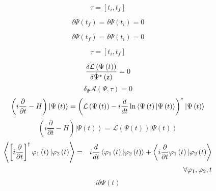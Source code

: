 \documentclass[aps,preprint]{revtex4}
\begin{document}
\begin{equation}
\tau =\left[ t_{i},t_{f}\right]
\end{equation}

\begin{equation}
\delta \Psi \left( t_{f}\right) =\delta \Psi \left( t_{i}\right) =0
\end{equation}

\begin{equation}
\delta \Psi \left( t_{f}\right) =\delta \Psi \left( t_{i}\right) =0
\end{equation}

\begin{equation}
\tau =\left[ t_{i},t_{f}\right]
\end{equation}

\begin{equation}
\frac{\delta \mathcal{L}\left( \Psi \left( t\right) \right) }{\delta \dot{%
\Psi}^{\ast }\left( \mathsf{z}\right) }=0
\end{equation}%
\begin{equation}
\delta _{\Psi }\mathcal{A}\left( \Psi ,\tau \right) =0
\end{equation}%
\begin{equation}
\left( i\frac{\partial }{\partial t}-H\right) \left| \Psi \left( t\right)
\right\rangle =\left( \mathcal{L}\left( \Psi \left( t\right) \right) -i\frac{%
d}{dt}\ln \left\langle \Psi \left( t\right) |\Psi \left( t\right)
\right\rangle \right) ^{\ast }\left| \Psi \left( t\right) \right\rangle
\end{equation}%
\begin{equation}
\left( i\frac{\partial }{\partial t}-H\right) \left| \Psi \left( t\right)
\right\rangle =\mathcal{L}\left( \Psi \left( t\right) \right) \left| \Psi
\left( t\right) \right\rangle
\end{equation}%
\begin{eqnarray}
\left\langle \left[ i\frac{\partial }{\partial t}\right] ^{\dagger }\varphi
_{1}\left( t\right) |\varphi _{2}\left( t\right) \right\rangle &=&i\frac{d}{%
dt}\left\langle \varphi _{1}\left( t\right) |\varphi _{2}\left( t\right)
\right\rangle +\left\langle i\frac{\partial }{\partial t}\varphi _{1}\left(
t\right) |\varphi _{2}\left( t\right) \right\rangle \\
&&\qquad \qquad \qquad \qquad \qquad \qquad \quad \forall \varphi
_{1},\varphi _{2},t
\end{eqnarray}%
\begin{equation}
i\delta \Psi \left( t\right)
\end{equation}%
\end{document}
